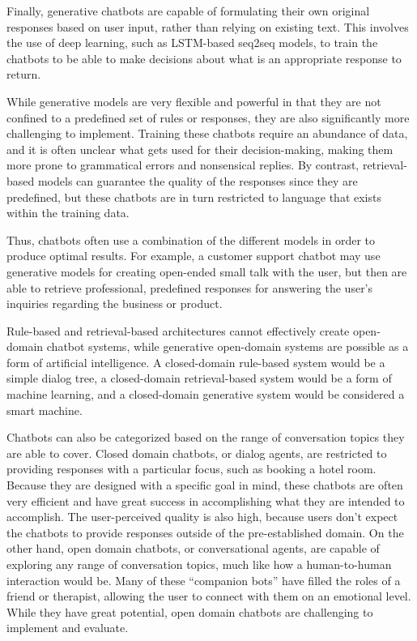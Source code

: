 \documentclass[
	12pt,				%
	oneside,   	        %
	a4paper,			%
	english,			%
	french,				%
	spanish,			%
	brazil,				%
	]{pacotes/abntex2}
\begin{document}
Finally, generative chatbots are capable of formulating their own original responses based on user input, rather than relying on existing text. This involves the use of deep learning, such as LSTM-based seq2seq models, to train the chatbots to be able to make decisions about what is an appropriate response to return.

While generative models are very flexible and powerful in that they are not confined to a predefined set of rules or responses, they are also significantly more challenging to implement. Training these chatbots require an abundance of data, and it is often unclear what gets used for their decision-making, making them more prone to grammatical errors and nonsensical replies. By contrast, retrieval-based models can guarantee the quality of the responses since they are predefined, but these chatbots are in turn restricted to language that exists within the training data.

Thus, chatbots often use a combination of the different models in order to produce optimal results. For example, a customer support chatbot may use generative models for creating open-ended small talk with the user, but then are able to retrieve professional, predefined responses for answering the user’s inquiries regarding the business or product.

Rule-based and retrieval-based architectures cannot effectively create open-domain chatbot systems, while generative open-domain systems are possible as a form of artificial intelligence. A closed-domain rule-based system would be a simple dialog tree, a closed-domain retrieval-based system would be a form of machine learning, and a closed-domain generative system would be considered a smart machine.

Chatbots can also be categorized based on the range of conversation topics they are able to cover. Closed domain chatbots, or dialog agents, are restricted to providing responses with a particular focus, such as booking a hotel room. Because they are designed with a specific goal in mind, these chatbots are often very efficient and have great success in accomplishing what they are intended to accomplish. The user-perceived quality is also high, because users don’t expect the chatbots to provide responses outside of the pre-established domain.
On the other hand, open domain chatbots, or conversational agents, are capable of exploring any range of conversation topics, much like how a human-to-human interaction would be. Many of these “companion bots” have filled the roles of a friend or therapist, allowing the user to connect with them on an emotional level. While they have great potential, open domain chatbots are challenging to implement and evaluate.
\end{document}
